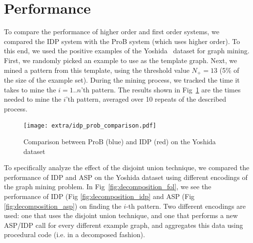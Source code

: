 \section{Performance}\label{sec:performance}
To compare the performance of higher order and first order systems, we compared the IDP system with the ProB system (which uses higher order).
To this end, we used the positive examples of the Yoshida~\citep{yoshida_dataset} dataset for graph mining.
First, we randomly picked an example to use as the template graph.
Next, we mined a pattern from this template, using the threshold value $N_{+} = 13$ (5\% of the size of the example set).
During the mining process, we tracked the time it takes to mine the $i=1..n$'th pattern.
The results shown in Fig~\ref{fig:ProBIDPComp} are the times needed to mine the $i$'th pattern, averaged over 10 repeats of the described process.

\begin{figure}[thb]
\texttt{[image: extra/idp\_prob\_comparison.pdf]}
\caption{\footnotesize{Comparison between ProB (blue) and IDP (red) on the Yoshida dataset}}
\label{fig:ProBIDPComp}
\end{figure}



To specifically analyze the effect of the disjoint union technique, we compared the performance of IDP and ASP on the Yoshida dataset using different encodings of the graph mining problem.
In Fig~\ref{fig:decomposition_fol}, we see the performance of IDP (Fig \ref{fig:decomposition_idp} and ASP (Fig \ref{fig:decomposition_asp}) on finding the $i$-th pattern.
Two different encodings are used: one that uses the disjoint union technique, and one that performs a new ASP/IDP call for every different example graph, and aggregates this data using procedural code (i.e. in a decomposed fashion).


